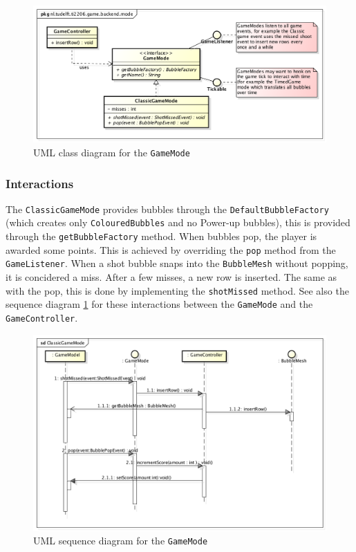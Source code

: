 \documentclass[a4paper]{article}
\begin{document}
\begin{figure}[H]
	\centering
	\includegraphics[scale=0.5]{GameMode.png}
    \caption{UML class diagram for the \texttt{GameMode}}
\end{figure}

\subsubsection*{Interactions}
The \texttt{ClassicGameMode} provides bubbles through the \texttt{DefaultBubbleFactory} (which creates only \texttt{ColouredBubbles} and no Power-up bubbles), this is provided through the \texttt{getBubbleFactory} method. When bubbles pop, the player is awarded some points. This is achieved by overriding the \texttt{pop} method from the \texttt{GameListener}. When a shot bubble snaps into the \texttt{BubbleMesh} without popping, it is concidered a miss. After a few misses, a new row is inserted. The same as with the pop, this is done by implementing the \texttt{shotMissed} method. See also the sequence diagram \ref{fig:seqgamemode} for these interactions between the \texttt{GameMode} and the \texttt{GameController}.

\begin{figure}[H]
	\centering
	\includegraphics[scale=0.5]{ClassicGameMode.png}
    \caption{UML sequence diagram for the \texttt{GameMode}}
    \label{fig:seqgamemode}
\end{figure}
\end{document}
